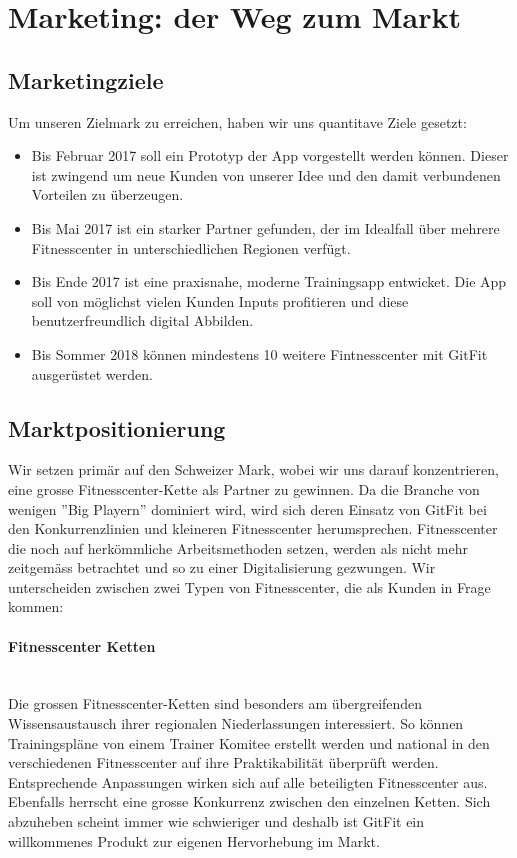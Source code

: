 \clearpage
\section{Marketing: der Weg zum Markt}\label{sec:marketing-der-weg-zum-markt}

\subsection{Marketingziele}
Um unseren Zielmark zu erreichen, haben wir uns quantitave Ziele gesetzt:
\begin{itemize}
	\item Bis Februar 2017 soll ein Prototyp der App vorgestellt werden können. Dieser ist zwingend um neue Kunden von unserer Idee und den damit verbundenen Vorteilen zu überzeugen.
	\item Bis Mai 2017 ist ein starker Partner gefunden, der im Idealfall über mehrere Fitnesscenter in unterschiedlichen Regionen verfügt.
	\item Bis Ende 2017 ist eine praxisnahe, moderne Trainingsapp entwicket. Die App soll von möglichst vielen Kunden Inputs profitieren und diese benutzerfreundlich digital Abbilden.
	\item Bis Sommer 2018 können mindestens 10 weitere Fintnesscenter mit GitFit ausgerüstet werden.
\end{itemize}

\subsection{Marktpositionierung}
Wir setzen primär auf den Schweizer Mark, wobei wir uns darauf konzentrieren, eine grosse Fitnesscenter-Kette als Partner zu gewinnen. Da die Branche von wenigen ''Big Playern'' dominiert wird,  wird sich deren Einsatz von GitFit bei den Konkurrenzlinien und kleineren Fitnesscenter herumsprechen. Fitnesscenter die noch auf herkömmliche Arbeitsmethoden setzen, werden als nicht mehr zeitgemäss betrachtet und so zu einer Digitalisierung gezwungen. Wir unterscheiden zwischen zwei Typen von Fitnesscenter, die als Kunden in Frage kommen:

\paragraph{Fitnesscenter Ketten} \hfill \\
Die grossen Fitnesscenter-Ketten sind besonders am übergreifenden Wissensaustausch ihrer regionalen Niederlassungen interessiert. So können Trainingspläne von einem Trainer Komitee erstellt werden und national in den verschiedenen Fitnesscenter auf ihre Praktikabilität überprüft werden. Entsprechende Anpassungen wirken sich auf alle beteiligten Fitnesscenter aus. Ebenfalls herrscht eine grosse Konkurrenz zwischen den einzelnen Ketten. Sich abzuheben scheint immer wie schwieriger und deshalb ist GitFit ein willkommenes Produkt zur eigenen Hervorhebung im Markt. 

